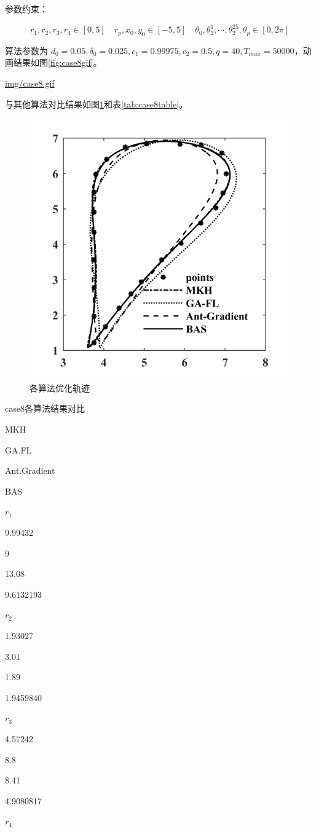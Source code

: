 \documentclass[]{ctexbook}
\theoremstyle{definition}
\theoremstyle{definition}
\theoremstyle{definition}
\theoremstyle{remark}
\begin{document}
参数约束：

\[
r_1,r_2,r_3,r_4\in[0,5]\quad r_p,x_0,y_0\in[-5,5] \quad \theta_0,\theta_2^1,\cdots,\theta_2^{25},\theta_p\in[0,2\pi]
\]

算法参数为
\(d_0 = 0.05,\delta_0=0.025,c_1=0.99975,c_2=0.5,q=40,T_{max}=50000\)，动画结果如图\ref{fig:case8gif}。

\url{img/case8.gif}

与其他算法对比结果如图\ref{fig:case8png}和表\ref{tab:case8table}。

\begin{figure}

{\centering \includegraphics[width=0.5\linewidth]{img/case8png} 

}

\caption{各算法优化轨迹}\label{fig:case8png}
\end{figure}

\label{tab:case8table}case8各算法结果对比

MKH

GA.FL

Ant.Gradient

BAS

\(r_1\)

9.99432

9

13.08

9.6132193

\(r_2\)

1.93027

3.01

1.89

1.9459840

\(r_3\)

4.57242

8.8

8.41

4.9080817

\(r_4\)
\end{document}
